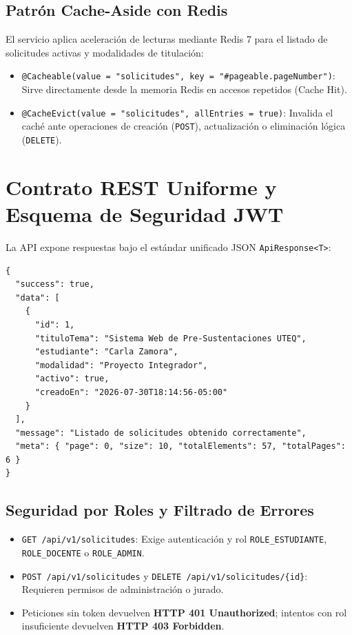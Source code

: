 \documentclass[10pt,a4paper]{article}
\begin{document}
\subsection{Patrón Cache-Aside con Redis}
El servicio aplica aceleración de lecturas mediante Redis 7 para el listado de solicitudes activas y modalidades de titulación:
\begin{itemize}
    \item \texttt{@Cacheable(value = "solicitudes", key = "\#pageable.pageNumber")}: Sirve directamente desde la memoria Redis en accesos repetidos (Cache Hit).
    \item \texttt{@CacheEvict(value = "solicitudes", allEntries = true)}: Invalida el caché ante operaciones de creación (\texttt{POST}), actualización o eliminación lógica (\texttt{DELETE}).
\end{itemize}

\vspace{0.3cm}

\section{Contrato REST Uniforme y Esquema de Seguridad JWT}

La API expone respuestas bajo el estándar unificado JSON \texttt{ApiResponse<T>}:

\begin{lstlisting}[caption={Respuesta Paginada Uniforme HTTP 200 OK}]
{
  "success": true,
  "data": [
    {
      "id": 1,
      "tituloTema": "Sistema Web de Pre-Sustentaciones UTEQ",
      "estudiante": "Carla Zamora",
      "modalidad": "Proyecto Integrador",
      "activo": true,
      "creadoEn": "2026-07-30T18:14:56-05:00"
    }
  ],
  "message": "Listado de solicitudes obtenido correctamente",
  "meta": { "page": 0, "size": 10, "totalElements": 57, "totalPages": 6 }
}
\end{lstlisting}

\subsection{Seguridad por Roles y Filtrado de Errores}
\begin{itemize}
    \item \texttt{GET /api/v1/solicitudes}: Exige autenticación y rol \texttt{ROLE\_ESTUDIANTE}, \texttt{ROLE\_DOCENTE} o \texttt{ROLE\_ADMIN}.
    \item \texttt{POST /api/v1/solicitudes} y \texttt{DELETE /api/v1/solicitudes/\{id\}}: Requieren permisos de administración o jurado.
    \item Peticiones sin token devuelven \textbf{HTTP 401 Unauthorized}; intentos con rol insuficiente devuelven \textbf{HTTP 403 Forbidden}.
\end{itemize}
\end{document}
